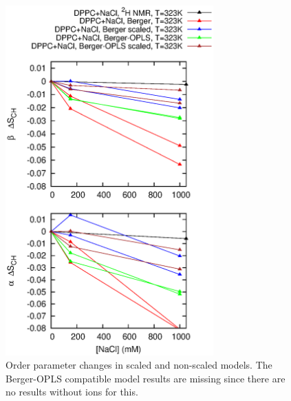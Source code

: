 \documentclass[pre,aps,floatfix,authordate1-4,twocolumn]{revtex4-1}
\begin{document}

\begin{figure}[]
  \centering
  \includegraphics[width=8cm]{../Fig/OrderParameterIONSchangesSCALED.eps} %
  \caption{\label{OPchangesSCALED}
    Order parameter changes in scaled and non-scaled models. The Berger-OPLS compatible model results are missing since there are
    no results without ions for this.
}
\end{figure}
\end{document}
